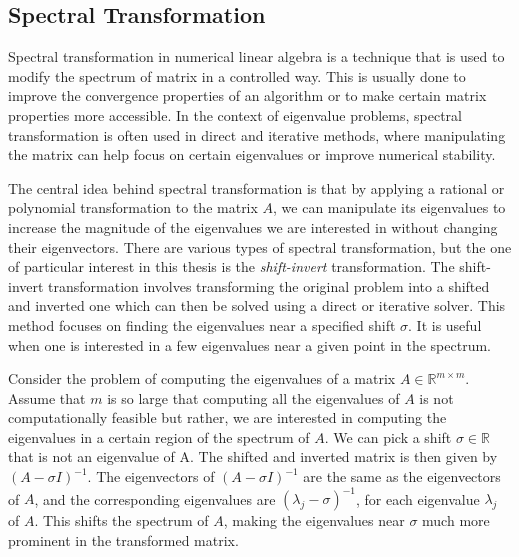 \subsection{Spectral Transformation}\label{sec:SpectralTransformationDefinition}
Spectral transformation in numerical linear algebra is a technique that is used to modify the spectrum of matrix in a controlled way. This is usually done to improve the convergence properties of an algorithm or to make certain matrix properties more accessible. In the context of eigenvalue problems, spectral transformation is often used in direct and iterative methods, where manipulating the matrix can help focus on certain eigenvalues or improve numerical stability.

The central idea behind spectral transformation is that by applying a rational or polynomial transformation to the matrix $A$, we can manipulate its eigenvalues to increase the magnitude of the eigenvalues we are interested in without changing their eigenvectors. There are various types of spectral transformation, but the one of particular interest in this thesis is the \textit{shift-invert} transformation. The shift-invert transformation involves transforming the original problem into a shifted and inverted one which can then be solved using a direct or iterative solver. This method focuses on finding the eigenvalues near a specified shift $\sigma$. It is useful when one is interested in a few eigenvalues near a given point in the spectrum.

Consider the problem of computing the eigenvalues of a matrix $A \in \mathbb{R}^{m \times m}$. Assume that $m$ is so large that computing all the eigenvalues of $A$ is not computationally feasible but rather, we are interested in computing the eigenvalues in a certain region of the spectrum of $A$. We can pick a shift $\sigma \in \mathbb{R}$ that is not an eigenvalue of A. The shifted and inverted matrix is then given by $(A - \sigma I)^{-1}$. The eigenvectors of $(A - \sigma I)^{-1}$ are the same as the eigenvectors of $A$, and the corresponding eigenvalues are $(\lambda_j - \sigma)^{-1}$, for each eigenvalue $\lambda_j$ of $A$. This shifts the spectrum of $A$, making the eigenvalues near $\sigma$ much more prominent in the transformed matrix.

